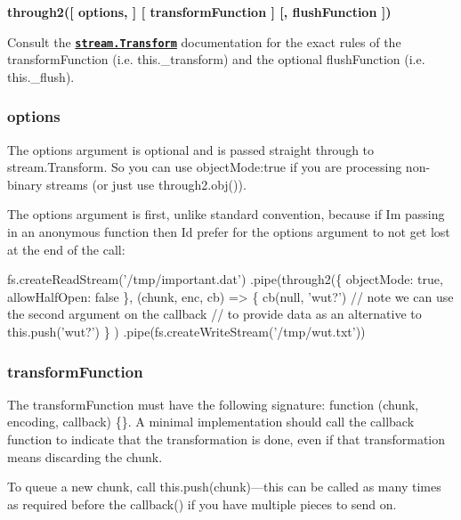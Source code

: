 {\bfseries {\ttfamily through2(\mbox{[} options, \mbox{]} \mbox{[} transform\+Function \mbox{]} \mbox{[}, flush\+Function \mbox{]})}}

Consult the {\bfseries \href{http://nodejs.org/docs/latest/api/stream.html#stream_class_stream_transform}{\tt stream.\+Transform}} documentation for the exact rules of the {\ttfamily transform\+Function} (i.\+e. {\ttfamily this.\+\_\+transform}) and the optional {\ttfamily flush\+Function} (i.\+e. {\ttfamily this.\+\_\+flush}).

\subsubsection*{options}

The options argument is optional and is passed straight through to {\ttfamily stream.\+Transform}. So you can use {\ttfamily object\+Mode\+:true} if you are processing non-\/binary streams (or just use {\ttfamily through2.\+obj()}).

The {\ttfamily options} argument is first, unlike standard convention, because if I\textquotesingle{}m passing in an anonymous function then I\textquotesingle{}d prefer for the options argument to not get lost at the end of the call\+:


\begin{DoxyCode}
fs.createReadStream('/tmp/important.dat')
  .pipe(through2(\{ objectMode: true, allowHalfOpen: false \},
    (chunk, enc, cb) => \{
      cb(null, 'wut?') // note we can use the second argument on the callback
                       // to provide data as an alternative to this.push('wut?')
    \}
  )
  .pipe(fs.createWriteStream('/tmp/wut.txt'))
\end{DoxyCode}


\subsubsection*{transform\+Function}

The {\ttfamily transform\+Function} must have the following signature\+: {\ttfamily function (chunk, encoding, callback) \{\}}. A minimal implementation should call the {\ttfamily callback} function to indicate that the transformation is done, even if that transformation means discarding the chunk.

To queue a new chunk, call {\ttfamily this.\+push(chunk)}---this can be called as many times as required before the {\ttfamily callback()} if you have multiple pieces to send on.

